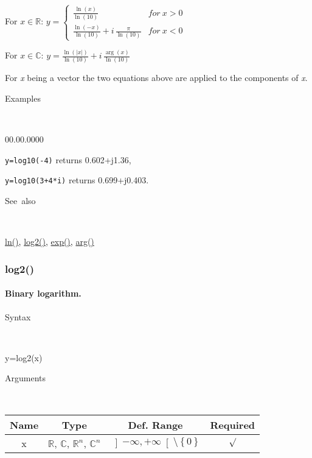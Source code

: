 \medskip{}
For $x\in\mathbb{R}$: $y=\left\{ \begin{array}{cc}
{\displaystyle \frac{\ln\left(x\right)}{\ln\left(10\right)}} & for\: x>0\\
{\displaystyle \frac{\ln\left(-x\right)}{\ln\left(10\right)}}+i\,{\displaystyle \frac{\pi}{\ln\left(10\right)}} & for\: x<0\end{array}\right.$ 

\medskip{}
For $x\in\mathbb{C}$: $y={\displaystyle \frac{\ln\left(\left|x\right|\right)}{\ln\left(10\right)}}+i\,{\displaystyle \frac{\arg\left(x\right)}{\ln\left(10\right)}}$
\medskip{}

For \textit{x} being a vector the two equations above are
applied to the components of \textit{x}.

\begin{description}
\item [Examples]~
\end{description}
\begin{lyxlist}{00.00.0000}
\item [\texttt{y=log10(-4)}]returns 0.602+j1.36,
\item [\texttt{y=log10(3+4{*}i)}]returns 0.699+j0.403.
\end{lyxlist}
\begin{description}
\item [See~also]~
\end{description}
\textcolor{blue}{\hyperlink{ln}{ln()}}\textcolor{black}{,} \textcolor{blue}{\hyperlink{log2}{log2()}}\textcolor{black}{,}
\textcolor{blue}{\hyperlink{exp}{exp()}}\textcolor{black}{,} \textcolor{blue}{\hyperlink{arg}{arg()}}


\newpage
\subsubsection*{\hypertarget{log2}{}{\Large log2()}}


\paragraph{\label{par:Binary-logarithm}Binary logarithm.}

\begin{description}
\item [Syntax]~
\end{description}
y=log2(x)

\begin{description}
\item [Arguments]~
\end{description}
\begin{tabular}{|c|c|c|c|}
\hline 
Name&
Type&
Def. Range&
Required\tabularnewline
\hline
\hline 
x&
$\mathbb{R}$, $\mathbb{C}$, $\mathbb{R}^{n}$, $\mathbb{C}^{n}$&
$\left]-\infty,+\infty\right[\setminus\left\{ 0\right\} $&
$\surd$\tabularnewline
\hline
\end{tabular}

